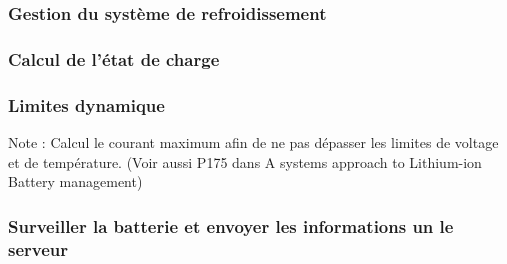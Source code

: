 		\subsubsection{Gestion du système de refroidissement}
		
		\subsubsection{Calcul de l'état de charge}
		
		\subsubsection{Limites dynamique}
		Note : Calcul le courant maximum afin de ne pas dépasser les limites de voltage et de température. (Voir aussi P175 dans A systems approach to Lithium-ion Battery management)
		
		\subsubsection{Surveiller la batterie et envoyer les informations un le serveur}
		
		

